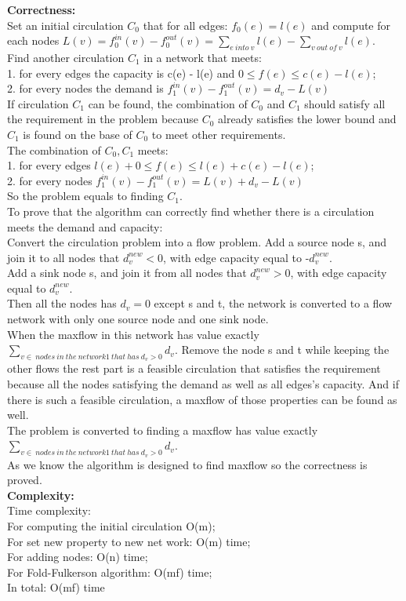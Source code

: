 \documentclass{article}
\begin{document}
\noindent\textbf{\large Correctness:\\}
Set an initial circulation $C_0$ that for all edges: $f_0(e) = l(e)$ and compute for each nodes $L(v) =  f_0^{in} (v) - f_0^{out} (v) =  \sum_{e\ into\ v} l(e) - \sum_{v\ out\ of\ v} l(e).$\\
Find another circulation $C_1$ in a network that meets:\\
1. for every edges the capacity is c(e) - l(e) and $0 \le f(e)\le c(e) - l(e)$;\\
2. for every nodes the demand is $f_1^{in} (v)  - f_1^{out} (v) =  d_v - L(v)$\\
If circulation $C_1$ can be found, the combination of $C_0$ and $C_1$ should satisfy all the requirement in the problem because $C_0$ already satisfies the lower bound and $C_1$ is found on the base of $C_0$ to meet other requirements.\\
The combination of $C_0,C_1$ meets:\\
1. for every edges $l(e)+0 \le f(e)\le l(e) + c(e) - l(e)$;\\
2. for every nodes $f_1^{in} (v)  - f_1^{out} (v) =  L(v) + d_v - L(v)$\\
So the problem equals to finding $C_1$.\\
To prove that the algorithm can correctly find whether there is a circulation meets the demand and capacity:\\
Convert the circulation problem into a flow problem. 
Add a source node s, and join it to all nodes that $d_v^{new}<0$, with edge capacity equal to -$d_v^{new}$.\\
Add a sink node s, and join it from all nodes that $d_v^{new}>0$, with edge capacity equal to $d_v^{new}$.\\
Then all the nodes has $d_v=0$ except s and t, the network is converted to a flow network with only one source node and one sink node.\\
When the maxflow in this network has value exactly $\sum_{v\in\ nodes\ in\ the\ network1\ that\ has\ d_v>0} d_v$. Remove the node s and t while keeping the other flows the rest part is a feasible circulation that satisfies the requirement because all the nodes satisfying the demand as well as all edges's capacity. 
And if there is such a feasible circulation, a maxflow of those properties can be found as well.\\
The problem is converted to finding a maxflow has value exactly $\sum_{v\in\ nodes\ in\ the\ network1\ that\ has\ d_v>0} d_v$.\\
As we know the algorithm is designed to find maxflow so the correctness is proved.\\
\textbf{\large Complexity:\\}
Time complexity:\\
For computing the initial circulation O(m);\\
For set new property to new net work: O(m) time;\\
For adding nodes: O(n) time;\\
For Fold-Fulkerson algorithm: O(mf) time;\\
In total: O(mf) time
\end{document}

